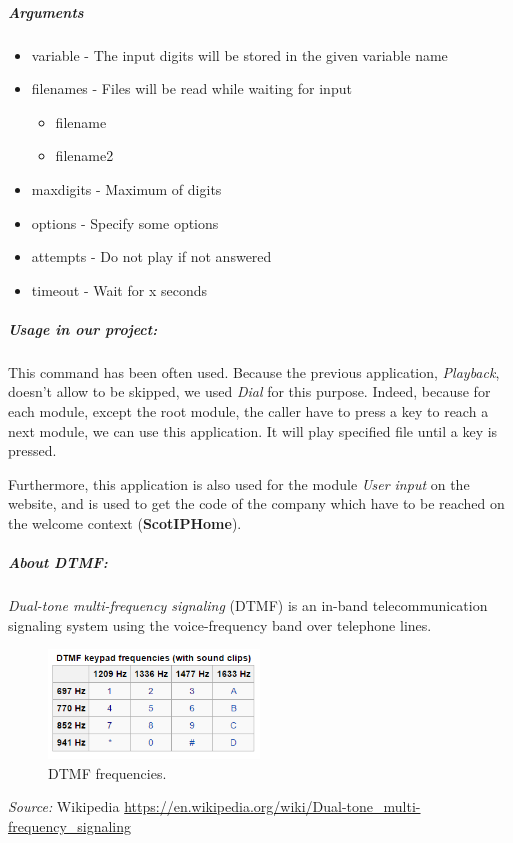 \subparagraph{Arguments}
\begin{itemize}
	\item variable - The input digits will be stored in the given variable name
	\item filenames - Files will be read while waiting for input
	\begin{itemize}
		\item filename
		\item filename2
	\end{itemize}
	
	\item maxdigits - Maximum of digits
	\item options - Specify some options
	\item attempts - Do not play if not answered
	\item timeout - Wait for x seconds
\end{itemize}

\subparagraph{Usage in our project:}
This command has been often used. Because the previous application, \textit{Playback}, doesn't allow to be skipped, we used \textit{Dial} for this purpose. Indeed, because for each module, except the root module, the caller have to press a key to reach a next module, we can use this application. It will play specified file until a key is pressed. \newline

Furthermore, this application is also used for the module \textit{User input} on the website, and is used to get the code of the company which have to be reached on the welcome context (\textbf{ScotIPHome}). 


\subparagraph{About DTMF:}
\textit{Dual-tone multi-frequency signaling} (DTMF) is an in-band telecommunication signaling system using the voice-frequency band over telephone lines. 

\begin{figure}[!ht]
  \caption{DTMF frequencies.}
  \centering
    \includegraphics[width=0.5\textwidth]{img/dtmf.png}
\end{figure}

{\textit{Source:} Wikipedia} \url{https://en.wikipedia.org/wiki/Dual-tone_multi-frequency_signaling}
	


